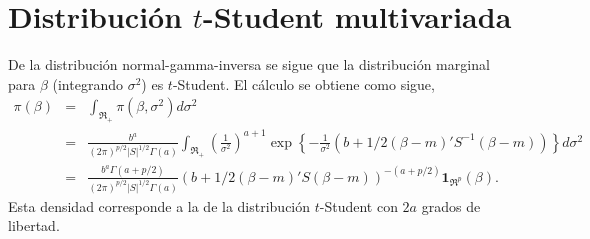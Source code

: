 \documentclass[11pt]{article}
\begin{document}
\section{Distribuci\'on $t$-Student multivariada}

De la distribuci\'on normal-gamma-inversa se sigue que la distribuci\'on marginal para $\beta$ (integrando $\sigma^2$) es $t$-Student. El c\'alculo se obtiene como sigue,
\begin{eqnarray}
\pi(\beta) 
& = &
\int_{\Re_+}\pi(\beta,\sigma^2)d\sigma^2 
\nonumber \\
& = &
\frac{b^a}{(2\pi)^{p/2}|S|^{1/2}\Gamma(a)}
\int_{\Re_{+}} 
\left(\frac{1}{\sigma^2}\right)^{a+1}
\exp\left\{-\frac{1}{\sigma^{2}}\left(b+1/2(\beta-m)'S^{-1}(\beta-m)\right)\right\}
d\sigma^2
\nonumber \\
& = &
\frac{b^a\Gamma(a+p/2)}{(2\pi)^{p/2}|S|^{1/2}\Gamma(a)}
\left(b+1/2(\beta-m)'S(\beta-m)\right)^{-(a+p/2)}
\boldsymbol{1}_{\Re^p}(\beta).
\end{eqnarray} 
Esta densidad corresponde a la de la distribuci\'on $t$-Student con $2a$ grados de libertad.



\end{document}
